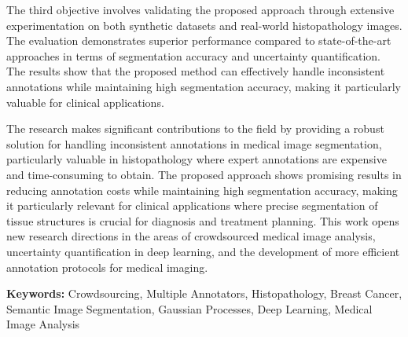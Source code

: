The third objective involves validating the proposed approach through
extensive experimentation on both synthetic datasets and real-world
histopathology images. The evaluation demonstrates superior
performance compared to state-of-the-art approaches in terms of
segmentation accuracy and uncertainty quantification. The results
show that the proposed method can effectively handle inconsistent
annotations while maintaining high segmentation accuracy, making it
particularly valuable for clinical applications.

The research makes significant contributions to the field by
providing a robust solution for handling inconsistent annotations in
medical image segmentation, particularly valuable in histopathology
where expert annotations are expensive and time-consuming to obtain.
The proposed approach shows promising results in reducing annotation
costs while maintaining high segmentation accuracy, making it
particularly relevant for clinical applications where precise
segmentation of tissue structures is crucial for diagnosis and
treatment planning. This work opens new research directions in the
areas of crowdsourced medical image analysis, uncertainty
quantification in deep learning, and the development of more
efficient annotation protocols for medical imaging.

\textbf{\small Keywords:} Crowdsourcing, Multiple Annotators,
Histopathology, Breast Cancer, Semantic Image Segmentation, Gaussian
Processes, Deep Learning, Medical Image Analysis
